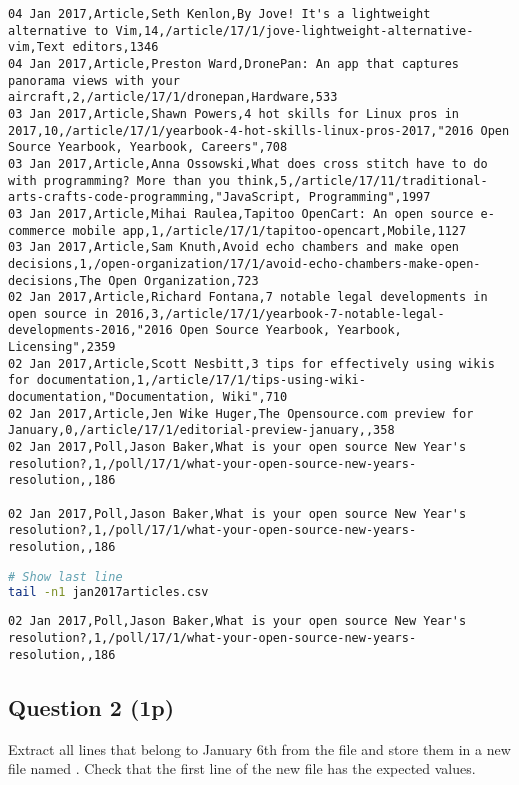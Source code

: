 \begin{lstlisting}[style=output]
04 Jan 2017,Article,Seth Kenlon,By Jove! It's a lightweight alternative to Vim,14,/article/17/1/jove-lightweight-alternative-vim,Text editors,1346
04 Jan 2017,Article,Preston Ward,DronePan: An app that captures panorama views with your aircraft,2,/article/17/1/dronepan,Hardware,533
03 Jan 2017,Article,Shawn Powers,4 hot skills for Linux pros in 2017,10,/article/17/1/yearbook-4-hot-skills-linux-pros-2017,"2016 Open Source Yearbook, Yearbook, Careers",708
03 Jan 2017,Article,Anna Ossowski,What does cross stitch have to do with programming? More than you think,5,/article/17/11/traditional-arts-crafts-code-programming,"JavaScript, Programming",1997
03 Jan 2017,Article,Mihai Raulea,Tapitoo OpenCart: An open source e-commerce mobile app,1,/article/17/1/tapitoo-opencart,Mobile,1127
03 Jan 2017,Article,Sam Knuth,Avoid echo chambers and make open decisions,1,/open-organization/17/1/avoid-echo-chambers-make-open-decisions,The Open Organization,723
02 Jan 2017,Article,Richard Fontana,7 notable legal developments in open source in 2016,3,/article/17/1/yearbook-7-notable-legal-developments-2016,"2016 Open Source Yearbook, Yearbook, Licensing",2359
02 Jan 2017,Article,Scott Nesbitt,3 tips for effectively using wikis for documentation,1,/article/17/1/tips-using-wiki-documentation,"Documentation, Wiki",710
02 Jan 2017,Article,Jen Wike Huger,The Opensource.com preview for January,0,/article/17/1/editorial-preview-january,,358
02 Jan 2017,Poll,Jason Baker,What is your open source New Year's resolution?,1,/poll/17/1/what-your-open-source-new-years-resolution,,186

02 Jan 2017,Poll,Jason Baker,What is your open source New Year's resolution?,1,/poll/17/1/what-your-open-source-new-years-resolution,,186
\end{lstlisting}

\begin{lstlisting}[language=bash]
# Show last line
tail -n1 jan2017articles.csv
\end{lstlisting}

\begin{lstlisting}[style=output]
02 Jan 2017,Poll,Jason Baker,What is your open source New Year's resolution?,1,/poll/17/1/what-your-open-source-new-years-resolution,,186
\end{lstlisting}

\subsection*{Question 2 (1p)}
Extract all lines that belong to January 6th from the file and store them in a new file named . Check that the first line of the new file has the expected values.

